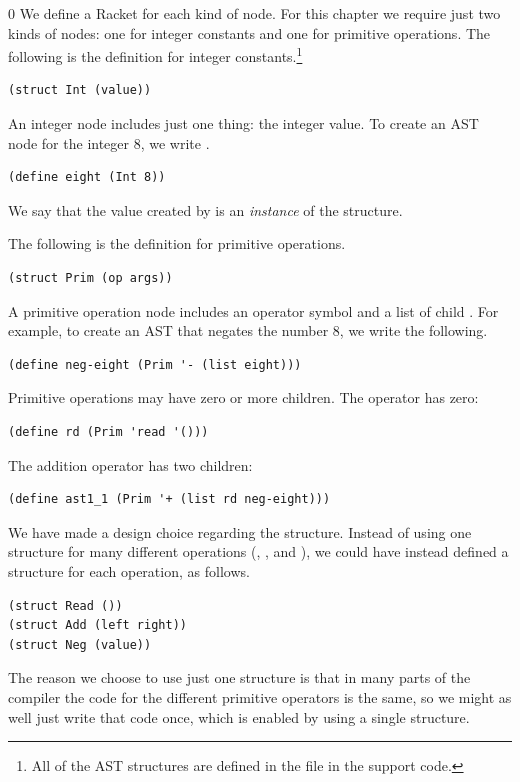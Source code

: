 \documentclass[7x10,nocrop]{TimesAPriori_MIT}%
\def\racketEd{0}
\def\edition{0}
\begin{document}
{\if\edition\racketEd
We define a Racket  for each kind of node.  For this
chapter we require just two kinds of nodes: one for integer constants
and one for primitive operations.  The following is the 
definition for integer constants.\footnote{All of the AST structures are
defined in the file  in the support code.}
\begin{lstlisting}
(struct Int (value))
\end{lstlisting}
An integer node includes just one thing: the integer value.
To create an AST node for the integer $8$, we write .
\begin{lstlisting}
(define eight (Int 8))
\end{lstlisting}
We say that the value created by  is an
\emph{instance} of the
 structure.

The following is the  definition for primitive operations.
\begin{lstlisting}
(struct Prim (op args))
\end{lstlisting}
A primitive operation node includes an operator symbol  and a
list of child . For example, to create an AST that negates
the number $8$, we write the following.
\begin{lstlisting}
(define neg-eight (Prim '- (list eight)))
\end{lstlisting}
Primitive operations may have zero or more children. The 
operator has zero:
\begin{lstlisting}
(define rd (Prim 'read '()))
\end{lstlisting}
The addition operator has two children:
\begin{lstlisting}
(define ast1_1 (Prim '+ (list rd neg-eight)))
\end{lstlisting}

We have made a design choice regarding the  structure.
Instead of using one structure for many different operations
(, \code{+}, and \code{-}), we could have instead defined a
structure for each operation, as follows.
\begin{lstlisting}
(struct Read ())
(struct Add (left right))
(struct Neg (value))
\end{lstlisting}
The reason we choose to use just one structure is that in many parts
of the compiler the code for the different primitive operators is the
same, so we might as well just write that code once, which is enabled
by using a single structure.
\fi}
\end{document}
